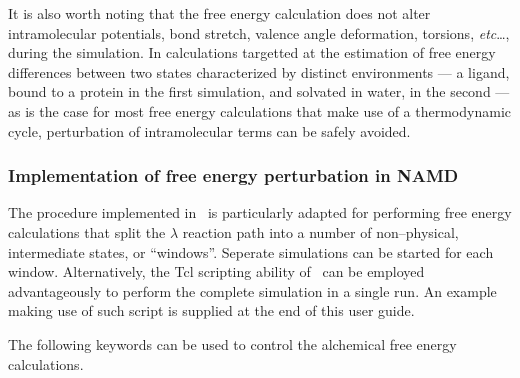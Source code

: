 It is also worth noting that
the free energy calculation does not alter intramolecular
potentials, \ie bond stretch, valence angle deformation, torsions,
{\it etc}\dots, during
the simulation. In calculations targetted at the estimation
of free energy differences between two states characterized by
distinct environments --- \eg a ligand, bound to a protein in
the first simulation,
and solvated in water, in the second --- as is the 
case for most free energy calculations that make use of a thermodynamic 
cycle, perturbation of intramolecular terms can be safely
avoided.~\cite{Boresch.99a}


\subsubsection{Implementation of free energy perturbation in NAMD}


The procedure implemented in \NAMD\ is particularly
adapted for performing free 
energy calculations that split the $\lambda$
reaction path into a number of non--physical,
intermediate states, or ``windows''. Seperate simulations 
can be started for each window.
Alternatively, the {\sc Tcl} scripting ability of 
\NAMD\ can be employed advantageously
to perform the complete simulation in a single run.
An example making use of such script is supplied at the end 
of this user guide.


The following keywords can be used to control the alchemical free 
energy calculations. 

